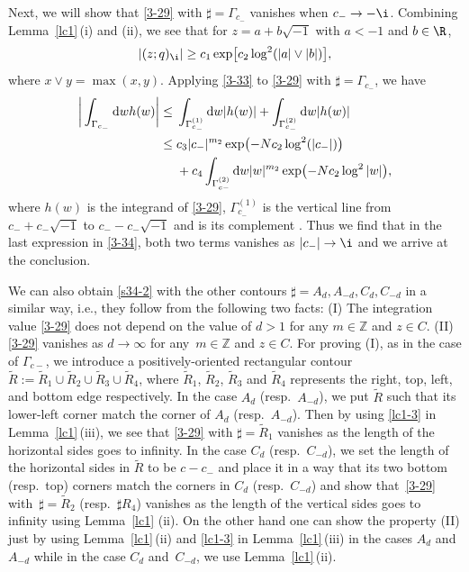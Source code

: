  Next, we will show that \eqref{3-29} with $\sharp=\Gamma_{c_-}$ vanishes when $c_-\rightarrow -\i$. Combining Lem\-ma~\ref{lc1}\,(i) and (ii), we see that
 for $z=a+b\sqrt{-1}$ with $a<-1$ and $b\in\R$,
 \begin{align}
 \label{3-33}
 |(z;q)_{\i}|\ge c_1\exp\bigl[c_2\log^2(|a|\vee |b|)\bigr],
 \end{align}
 where $x\vee y=\max(x,y)$. Applying \eqref{3-33} to
 \eqref{3-29} with $\sharp=\Gamma_{c_-}$, we have
 \begin{align}
 \bigg| \int_{\Gamma_{c_-}} {\rm d}w h(w)\bigg|
 \le{}& \int_{\Gamma^{(1)}_{c_-}}{\rm d}w |h(w)|+\int_{\Gamma^{(2)}_{c_-}}{\rm d}w |h(w)|
 \nonumber\\
\le{}& c_3 |c_-|^{m_2}\exp\bigl(-Nc_2\log^2(|c_-|)\bigr) \nonumber\\
 &+c_4\int_{\Gamma_{c-}^{(2)}} {\rm d}w |w|^{m_2}
 \exp\bigl(-Nc_2\log^2|w|\bigr),
 \label{3-34}
 \end{align}
 where $h(w)$ is the integrand of \eqref{3-29}, $\Gamma_{c_-}^{(1)}$
 is the vertical line from $c_-+c_-\sqrt{-1}$ to $c_--c_-\sqrt{-1}$ and  is its complement .
 Thus we find that in the last expression in \eqref{3-34}, both two terms vanishes as $|c_-|\rightarrow\i$ and we arrive at the conclusion.

 We can also obtain \eqref{s34-2} with the other contours $\sharp=A_d,A_{-d},C_d,C_{-d}$ in a similar way, i.e., they follow from the following two facts: (I) The integration value \eqref{3-29} does not depend on the value of $d>1$ for any $m\in\mathbb{Z}$ and $z\in C$. (II) \eqref{3-29} vanishes as $d\rightarrow\infty$ for any~${m\in\mathbb{Z}}$ and $z\in C$. For proving (I), as in the case of $\Gamma_{c-}$, we introduce a positively-oriented rectangular contour~${\tilde{R}:=\tilde{R}_1\cup\tilde{R}_2\cup\tilde{R}_3\cup\tilde{R}_4}$, where $\tilde{R}_1$, $\tilde{R}_2$, $\tilde{R}_3$ and $\tilde{R}_4$ represents the right, top, left, and bottom edge respectively. In the case $A_d$ (resp.\ $A_{-d}$), we put $\tilde{R}$ such that its lower-left corner match the corner of $A_d$ (resp.\ $A_{-d}$). Then by using \eqref{lc1-3} in Lemma~\ref{lc1}\,(iii), we see that \eqref{3-29} with $\sharp=\tilde{R}_1$ vanishes as the length of the horizontal sides goes to infinity. In the case $C_d$ (resp.~$C_{-d}$), we set the length of the horizontal sides in $\tilde{R}$ to be $c-c_-$ and place it in a way that its two bottom (resp.\ top) corners match the corners in $C_d$ (resp.\ $C_{-d}$) and show that~\eqref{3-29} with~${\sharp=\tilde{R}_2}$ (resp.\ $\sharp{R}_4$) vanishes as the length of the vertical sides goes to infinity using Lemma~\ref{lc1} (ii). On the other hand one can show the property (II) just by using Lemma~\ref{lc1}\,(ii) and \eqref{lc1-3} in Lemma~\ref{lc1}\,(iii) in the cases $A_d$ and $A_{-d}$ while in the case $C_{d}$ and~$C_{-d}$, we use Lemma~\ref{lc1}\,(ii).


